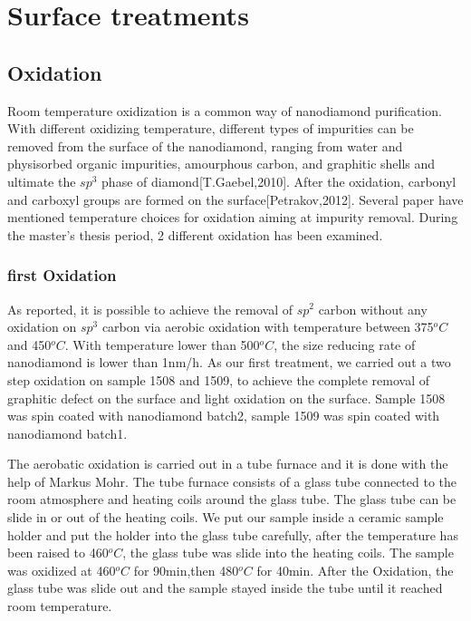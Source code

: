 
\chapter{Surface treatments} %

\label{Chapter2.5} %



\section{Oxidation}
Room temperature oxidization is a common way of nanodiamond purification. With different oxidizing temperature, different types of impurities can be removed from the surface of the nanodiamond, ranging from water and physisorbed organic impurities, amourphous carbon, and graphitic shells and ultimate the $sp^{3}$ phase of diamond[T.Gaebel,2010]. After the oxidation, carbonyl and carboxyl groups are formed on the surface[Petrakov,2012]. Several paper have mentioned temperature choices for oxidation aiming at impurity removal. During the master's thesis period, 2 different oxidation has been examined.

\subsection[first Oxidation]{first Oxidation}
As reported, it is possible to achieve the removal of $sp^{2}$ carbon without any oxidation on $sp^{3}$ carbon via aerobic oxidation with temperature between 375$^{o}C$ and 450$^{o}C$. With temperature lower than 500$^{o}C$, the size reducing rate of nanodiamond is lower than 1nm/h. As our first treatment, we carried out a two step oxidation on sample 1508 and 1509, to achieve the complete removal of graphitic defect on the surface and light oxidation on the surface. Sample 1508 was spin coated with nanodiamond batch2, sample 1509 was spin coated with nanodiamond batch1.

The aerobatic oxidation is carried out in a tube furnace and it is done with the help of Markus Mohr. The tube furnace consists of a glass tube connected to the room atmosphere and heating coils around the glass tube. The glass tube can be slide in or out of the heating coils. We put our sample inside a ceramic sample holder and put the holder into the glass tube carefully, after the temperature has been raised to 460$^{o}C$, the glass tube was slide into the heating coils. The sample was oxidized at 460$^{o}C$ for 90min,then 480$^{o}C$ for 40min. After the Oxidation, the glass tube was slide out and the sample stayed inside the tube until it reached room temperature.

